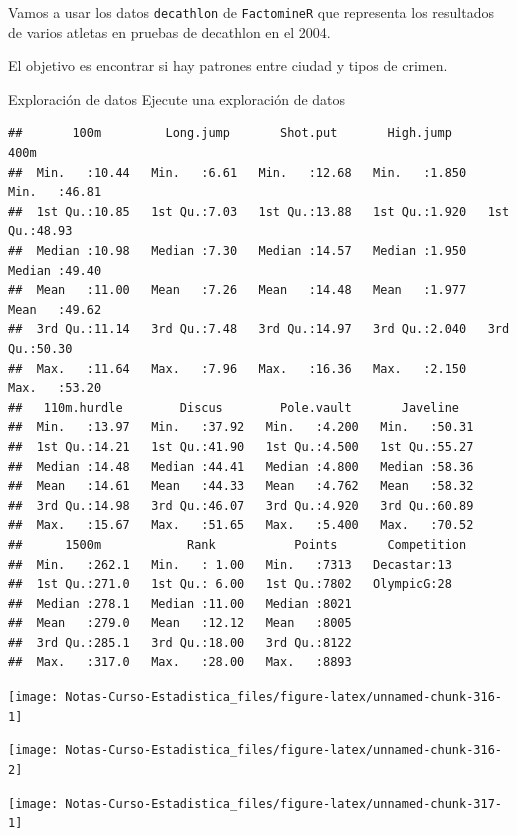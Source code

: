 \documentclass[
  12pt,
]{book}
\theoremstyle{definition}
\theoremstyle{definition}
\theoremstyle{definition}
\theoremstyle{remark}
\begin{document}
Vamos a usar los datos \texttt{decathlon} de \texttt{FactomineR} que representa los resultados de varios atletas en pruebas de decathlon en el 2004.

El objetivo es encontrar si hay patrones entre ciudad y tipos de crimen.

Exploración de datos
Ejecute una exploración de datos

\begin{verbatim}
##       100m         Long.jump       Shot.put       High.jump          400m      
##  Min.   :10.44   Min.   :6.61   Min.   :12.68   Min.   :1.850   Min.   :46.81  
##  1st Qu.:10.85   1st Qu.:7.03   1st Qu.:13.88   1st Qu.:1.920   1st Qu.:48.93  
##  Median :10.98   Median :7.30   Median :14.57   Median :1.950   Median :49.40  
##  Mean   :11.00   Mean   :7.26   Mean   :14.48   Mean   :1.977   Mean   :49.62  
##  3rd Qu.:11.14   3rd Qu.:7.48   3rd Qu.:14.97   3rd Qu.:2.040   3rd Qu.:50.30  
##  Max.   :11.64   Max.   :7.96   Max.   :16.36   Max.   :2.150   Max.   :53.20  
##   110m.hurdle        Discus        Pole.vault       Javeline    
##  Min.   :13.97   Min.   :37.92   Min.   :4.200   Min.   :50.31  
##  1st Qu.:14.21   1st Qu.:41.90   1st Qu.:4.500   1st Qu.:55.27  
##  Median :14.48   Median :44.41   Median :4.800   Median :58.36  
##  Mean   :14.61   Mean   :44.33   Mean   :4.762   Mean   :58.32  
##  3rd Qu.:14.98   3rd Qu.:46.07   3rd Qu.:4.920   3rd Qu.:60.89  
##  Max.   :15.67   Max.   :51.65   Max.   :5.400   Max.   :70.52  
##      1500m            Rank           Points       Competition
##  Min.   :262.1   Min.   : 1.00   Min.   :7313   Decastar:13  
##  1st Qu.:271.0   1st Qu.: 6.00   1st Qu.:7802   OlympicG:28  
##  Median :278.1   Median :11.00   Median :8021                
##  Mean   :279.0   Mean   :12.12   Mean   :8005                
##  3rd Qu.:285.1   3rd Qu.:18.00   3rd Qu.:8122                
##  Max.   :317.0   Max.   :28.00   Max.   :8893
\end{verbatim}

\begin{center}\texttt{[image: Notas-Curso-Estadistica\_files/figure-latex/unnamed-chunk-316-1]} \end{center}

\begin{center}\texttt{[image: Notas-Curso-Estadistica\_files/figure-latex/unnamed-chunk-316-2]} \end{center}

\begin{center}\texttt{[image: Notas-Curso-Estadistica\_files/figure-latex/unnamed-chunk-317-1]} \end{center}
\end{document}
